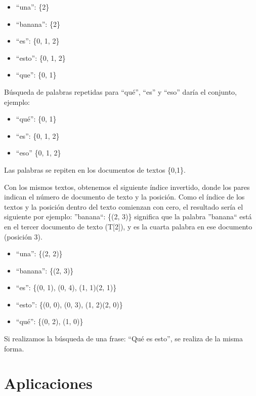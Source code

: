 \documentclass{article}
\begin{document}
\begin{itemize}
    \item ``una'': 	\{2\} 
\item ``banana'': 	\{2\} 
\item ``es'': 		\{0, 1, 2\} 
\item ``esto'': 	\{0, 1, 2\} 
\item ``que'': 	\{0, 1\}
\end{itemize}

Búsqueda de palabras repetidas para ``qué'', ﻿``es'' ﻿y ﻿``eso'' ﻿daría el conjunto, ejemplo:

\begin{itemize}
    \item ``qué'':  	\{0, 1\}
 \item﻿``es'': 		\{0, 1, 2\}
 \item ``eso'' 	\{0, 1, 2\} 
\end{itemize}

Las palabras se repiten en los documentos de textos \{0,1\}.

﻿Con los mismos textos, obtenemos el siguiente índice invertido, donde los pares indican el número de documento de texto y la posición. Como el índice de los textos y la posición dentro del texto comienzan con cero, el resultado sería el siguiente por ejemplo: ﻿''banana``: \{(2, 3)\} ﻿significa que la palabra ''banana`` está en el tercer documento de texto (﻿T[2]﻿), y es la cuarta palabra en ese documento (posición 3).

\begin{itemize}
\item ``una'': 	\{(2, 2)\} 
\item ``banana'': 	\{(2, 3)\} 
\item ``es'': 		\{(0, 1), (0, 4), ﻿(1, 1)﻿(2, 1)\} 
\item ``esto'': 	\{(0, 0), (0, 3), ﻿(1, 2)﻿(2, 0)\} 
\item ``qué'': 	\{(0, 2), ﻿(1, 0)\}
\end{itemize}

Si realizamos la búsqueda de una frase: ﻿``Qué es esto'', se realiza de la misma forma. 


\section{Aplicaciones}
\end{document}
